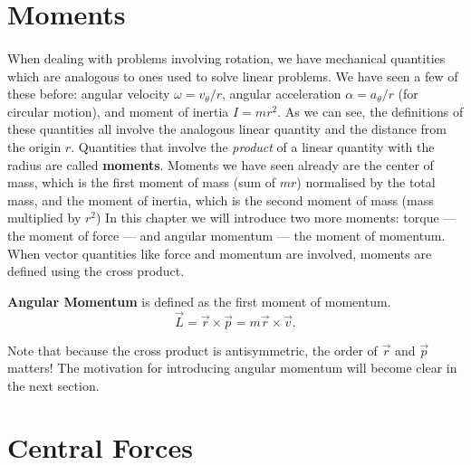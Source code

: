 \documentclass[../classical_mechanics.tex]{subfiles}
\begin{document}

    \section{Moments}\label{sec:moments}
        \paragraph{}
        When dealing with problems involving rotation, we have mechanical quantities which are analogous to ones used to solve linear problems.
        We have seen a few of these before: angular velocity $\omega=v_\theta/r$, angular acceleration $\alpha=a_\theta/r$ (for circular motion), and moment of inertia $I=mr^2$.
        As we can see, the definitions of these quantities all involve the analogous linear quantity and the distance from the origin $r$.
        Quantities that involve the \textit{product} of a linear quantity with the radius are called \textbf{moments}.
        Moments we have seen already are the center of mass, which is the first moment of mass (sum of $mr$) normalised by the total mass, and the moment of inertia, which is the second moment of mass (mass multiplied by $r^2$)
        In this chapter we will introduce two more moments: torque --- the moment of force --- and angular momentum --- the moment of momentum.
        When vector quantities like force and momentum are involved, moments are defined using the cross product.
        \begin{definition}
            \textbf{Angular Momentum} is defined as the first moment of momentum.
            \begin{equation}
                \vec{L}=\vec{r}\times\vec{p}=m\vec{r}\times\vec{v}.
            \end{equation}
        \end{definition}
        Note that because the cross product is antisymmetric, the order of $\vec{r}$ and $\vec{p}$ matters!
        The motivation for introducing angular momentum will become clear in the next section. 

    \section{Central Forces}\label{sec:central-forces}
\end{document}
